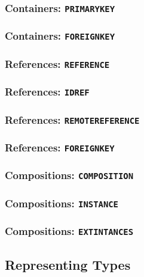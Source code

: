 \documentclass[11pt,a4paper]{ivoa}
\begin{document}
\subsubsection{Containers:
\texttt{PRIMARYKEY}}\label{containers-primarykey}

\subsubsection{Containers:
\texttt{FOREIGNKEY}}\label{containers-foreignkey}

\subsubsection{References:
\texttt{REFERENCE}}\label{references-reference}

\subsubsection{References: \texttt{IDREF}}\label{references-idref}

\subsubsection{References:
\texttt{REMOTEREFERENCE}}\label{references-remotereference}

\subsubsection{References:
\texttt{FOREIGNKEY}}\label{references-foreignkey}

\subsubsection{Compositions:
\texttt{COMPOSITION}}\label{compositions-composition}

\subsubsection{Compositions:
\texttt{INSTANCE}}\label{compositions-instance}

\subsubsection{Compositions:
\texttt{EXTINTANCES}}\label{compositions-extintances}

\subsection{Representing Types}\label{sec:norm-types}
\end{document}
